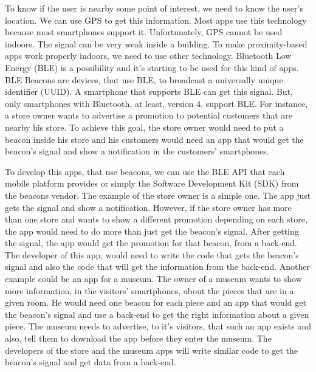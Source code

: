 To know if the user is nearby some point of interest,
we need to know the user's location. We can use GPS to
get this information. Most apps use this technology because
most smartphones support it. 
Unfortunately, GPS cannot be used indoors. The signal can
be very weak inside a building. To make proximity-based
apps work properly indoors, we need to use other 
technology. Bluetooth Low Energy (BLE) is a possibility 
and it's starting to be used for this kind of apps.
BLE Beacons are devices, that use BLE, to broadcast a 
universally unique identifier (UUID). A smartphone that
supports BLE can get this signal. But, only smartphones
with Bluetooth, at least, version 4, support BLE.
For instance, a store owner wants to advertise a promotion
to potential customers that are nearby his store. To 
achieve this goal, the store owner would need to put
a beacon inside his store and his customers would need an
app that would get the beacon's signal and show a 
notification in the customers' smartphones. 

To develop this apps, that use beacons, we can use the 
BLE API that each 
mobile platform provides or simply the Software
Development Kit (SDK) from the 
beacons vendor. The example of the store owner is a
simple one. The app just gets the signal and show a 
notification. However, if the store owner has more than
one store and wants to show a different promotion depending
on each store, the app would need to do more than just get
the beacon's signal. After getting the signal, the app
would get the promotion for that beacon, from a 
back-end. The developer of this app, would need to
write the code that gets the beacon's signal and also
the code that will get the information from the back-end.
Another example could be an app for a museum. The owner
of a museum wants to show more information, in the 
visitors' smartphones, about the pieces that are in a given
room. He would need one beacon for each piece and an app
that would get the beacon's signal and use a
back-end to get the right information about a given piece.
The museum needs to advertise, to it's visitors, that such
an app exists and also, tell them to download the app
before they enter the museum. The developers of the
store and the museum apps will write similar code to get
the beacon's signal and get data from a back-end.

